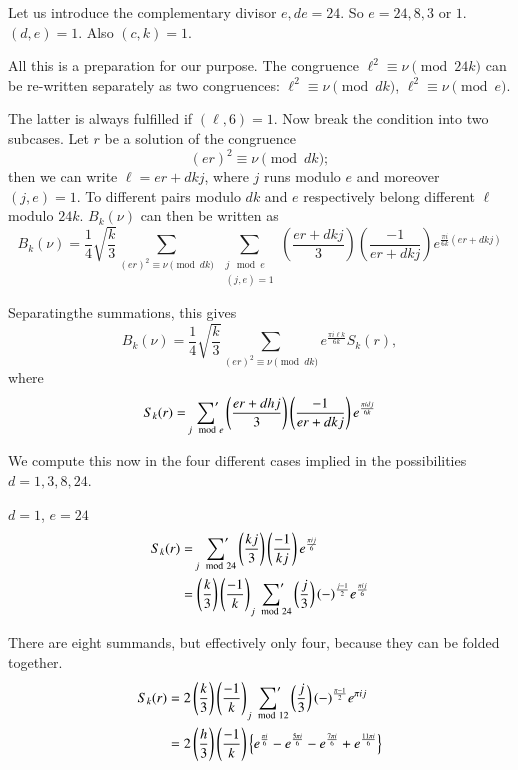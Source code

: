 Let us introduce the complementary divisor $e, de= 24$. So $e= 24, 8,
3$ or $1$. $(d, e)=1$. Also $(c, k)=1$. 

All this is a preparation for our purpose. The congruence $\ell^2
\equiv \nu \pmod{24 k}$ can be re-written separately as two
congruences: $\ell^2 \equiv \nu \pmod{dk}$, $\ell^2 \equiv \nu
\pmod{e}$.

The latter is always fulfilled if $(\ell, 6)=1$. Now break the
condition into two subcases. Let $r$ be a solution of the congruence
$$
(er)^2 \equiv \nu \pmod{dk};
$$
then we can write $\ell=er+ dkj$, where $j$ runs modulo $e$ and
moreover $(j, e)=1$. To different pairs modulo $dk$ and $e$
respectively belong different $\ell$ modulo $24k$. $B_k(\nu)$ can then
be written as 
$$
B_k (\nu) = \frac{1}{4} \sqrt{\frac{k}{3}} \sum_{(er)^2 \equiv \nu
  \pmod{dk}} ~\sum_{\substack{j \mod
    e\\(j, e)=1}} \left( \frac{er + dkj}{3}\right) \left(\frac{-1}{er
  + dkj} \right) e^{\frac{\pi i}{6k} (er+dkj)}
$$

Separating\pageoriginale the summations, this gives
$$
B_k (\nu) = \frac{1}{4} \sqrt{\frac{k}{3}} \sum_{(er)^2 \equiv \nu
  \pmod{dk}} e^{\frac{\pi i\ell k}{6k}} S_k (r),
$$
where 
$$
S_k(r) = \sideset{}{'}\sum_{j \mod e} \left(\frac{er+dhj}{3} \right)
\left(\frac{-1}{er+ dkj} \right) e^{\frac{\pi i d j}{6k}}
$$

We compute this now in the four different cases implied in the
possibilities $d=1, 3, 8, 24$.

\setcounter{case}{0}
\begin{case}\label{part3:lec24:case1}
  $d=1$, $e=24$
  \begin{align*}
    S_k (r) & = \sideset{}{'}\sum_{j \mod 24} \left(
    \frac{kj}{3}\right)\left(\frac{-1}{kj}  \right) e^{\frac{\pi i
        j}{6}}\\
    & = \left(\frac{k}{3}\right)\left(\frac{-1}{k}\right) \sideset{}{'}\sum_{j
      \mod 24} \left(\frac{j}{3}\right) (-)^{\frac{j-1}{2}}
    e^{\frac{\pi i j}{6}}
  \end{align*}
\end{case}
  There are eight summands, but effectively only four, because they
  can be folded together.
  \begin{align*}
    S_k (r) & = 2\left(\frac{k}{3}\right)\left(\frac{-1}{k} \right)
    \sideset{}{'}\sum_{j \mod 12} \left(\frac{j}{3} \right)
    (-)^{\frac{\pi -1}{2}} e^{\pi i j}\\ 
    & = 2 \left( \frac{h}{3}\right) \left(\frac{-1}{k} \right) \left\{
    e^{\frac{\pi i}{6}} -e^{\frac{5 \pi i}{6}} -e^{\frac{7 \pi i}{6}}
    + e^{\frac{11 \pi i}{6}}\right\}
\end{align*}

